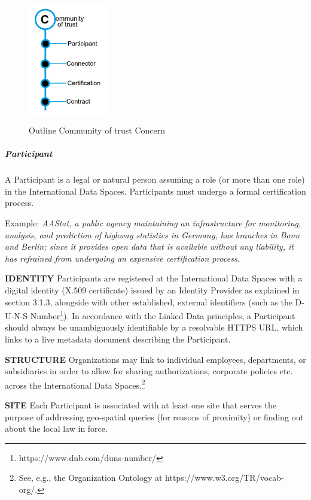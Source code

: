 \begin{figure}[H]
	\begin{Center}
		\includegraphics[width=1.36in,height=2.12in]{./media/image48.png}
		\caption{Outline Community of trust Concern}
		\label{fig:community_of_trust_concern}
	\end{Center}
\end{figure}


\subparagraph*{Participant}
A Participant is a legal or natural person assuming a role (or more than one role) in the International Data Spaces. Participants must undergo a formal certification process.  

Example: \textit{AAStat, a public agency maintaining an infrastructure for monitoring, analysis, and prediction of highway statistics in Germany, has branches in Bonn and Berlin; since it provides open data that is available without any liability, it has refrained from undergoing an expensive certification process}.

\textbf{IDENTITY} Participants are registered at the International Data Spaces with a digital identity (X.509 certificate) issued by an Identity Provider as explained in section 3.1.3,
alongside with other established, external identifiers (such as the D-U-N-S Number\footnote{https://www.dnb.com/duns-number/ }). In accordance with the Linked Data principles, a Participant should always be unambiguously identifiable by a resolvable HTTPS URL, which links to a live metadata document describing the Participant.

\textbf{STRUCTURE} Organizations may link to individual employees, departments, or subsidiaries in order to allow for sharing authorizations, corporate policies etc. across the International Data Spaces.\footnote{See, e.g., the Organization Ontology at https://www.w3.org/TR/vocab-org/.}

\textbf{SITE} Each Participant is associated with at least one site that serves the purpose of addressing geo-spatial queries (for reasons of proximity) or finding out about the local law in force. 

